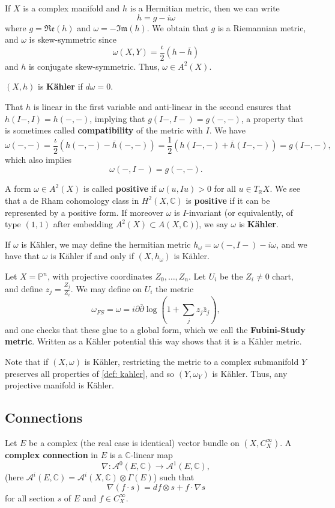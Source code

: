 \documentclass[11pt]{amsart}
\newcommand{\cA}{\mathcal{A}}
\newcommand{\fI}{\mathfrak{I}}
\newcommand{\fR}{\mathfrak{R}}
\newcommand{\fe}{\mathfrak{e}}
\newcommand{\fm}{\mathfrak{m}}
\newcommand{\bP}{\mathbb{P}}
\newcommand{\tbf}[1]{\textbf{#1}}
\newcommand{\R}{\mathbb R}
\newcommand{\C}{\mathbb C}
\newcommand{\pa}[1]{\left(#1\right)}
\theoremstyle{definition}
\numberwithin{equation}{section}
\begin{document}
If $X$ is a complex manifold and $h$ is a  Hermitian metric, then we can write
\[
h=g-i\omega
\]
where $g=\fR\fe(h)$ and $\omega=-\fI\fm(h)$. We obtain that $g$ is a Riemannian metric, and $\omega$ is skew-symmetric since
\[
\omega(X,Y)=\frac{\iota}{2}(h-\overline h)
\]
and $h$ is conjugate skew-symmetric. Thus, $\omega\in A^2(X)$.
\begin{definition}
	$(X,h)$ is \tbf{Kähler} if $d\omega=0$.
\end{definition}
That $h$ is linear in the first variable and anti-linear in the second ensures that $h(I-,I)=h(-,-)$, implying that $g(I-,I-)=g(-,-)$, a property that is sometimes called \tbf{compatibility} of the metric with $I$. We have 
\[
\omega(-,-)=\frac{\iota}{2}(h(-,-)-\overline h(-,-))=\frac{1}{2}(h(I-,-)+\overline h (I-,-))=g(I-,-),
\]
which also implies
\[
\omega(-,I-)=g(-,-).
\]
\begin{definition}\label{def: kahler}
	A form $\omega\in A^2(X)$ is called \tbf{positive} if $\omega(u,Iu)>0$ for all $u\in T_\R X$. We see that a de Rham cohomology class in $H^2(X,\C)$ is \tbf{positive} if it can be represented by a positive form. If moreover $\omega$ is $I$-invariant (or equivalently, of type $(1,1)$ after embedding $A^2(X)\subset A(X,\C)$), we say $\omega$ is \tbf{Kähler}.
\end{definition}
If $\omega$ is Kähler, we may define the hermitian metric $h_\omega=\omega(-,I-)-i\omega$, and we have that $\omega$ is Kähler if and only if $(X,h_\omega)$ is Kähler.
\begin{example}
	Let $X=\bP^n$, with projective coordinates $Z_0,\dots,Z_n$. Let $U_i$ be the $Z_i\neq 0$ chart, and define $z_j=\frac{Z_j}{Z_i}$. We may define on $U_i$ the metric
	\[
	\omega_{FS}=\omega=i\partial\overline\partial\log\pa{1+\sum_jz_j\overline z_j},
	\]
	and one checks that these glue to a global form, which we call the \tbf{Fubini-Study metric}. Written as a Kähler potential this way shows that it is a Kähler metric.
\end{example}
Note that if $(X,\omega)$ is Kähler, restricting the metric to a complex submanifold $Y$ preserves all properties of \autoref{def: kahler}, and so $(Y,\omega_Y)$ is Kähler. Thus, any projective manifold is Kähler.

\subsection{Connections}

Let $E$ be a complex (the real case is identical) vector bundle on $(X,C_X^\infty)$. A \tbf{complex connection} in $E$ is a $\C$-linear map 
\[
\nabla:\cA^0(E,\C)\to \cA^1(E,\C),
\]
(here $\cA^i(E,\C)= \cA^i(X,\C)\otimes \Gamma(E)$) such that
%
\[
\nabla(f\cdot s)=df\otimes s+f\cdot\nabla s
\]
for all section $s$ of $E$ and $f\in C^\infty_X$.
\end{document}
